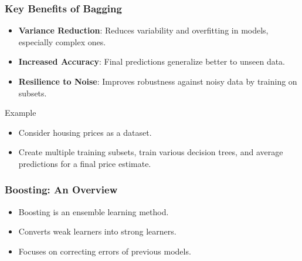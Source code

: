 \documentclass{beamer}
\begin{document}
\begin{frame}[fragile]
    \frametitle{Key Benefits of Bagging}
    \begin{itemize}
        \item \textbf{Variance Reduction}: Reduces variability and overfitting in models, especially complex ones.
        \item \textbf{Increased Accuracy}: Final predictions generalize better to unseen data.
        \item \textbf{Resilience to Noise}: Improves robustness against noisy data by training on subsets.
    \end{itemize}
    
    \begin{block}{Example}
    \begin{itemize}
        \item Consider housing prices as a dataset.
        \item Create multiple training subsets, train various decision trees, and average predictions for a final price estimate.
    \end{itemize}
    \end{block}
\end{frame}

\begin{frame}[fragile]
    \frametitle{Boosting: An Overview}
    \begin{itemize}
        \item Boosting is an ensemble learning method.
        \item Converts weak learners into strong learners.
        \item Focuses on correcting errors of previous models.
    \end{itemize}
\end{frame}
\end{document}
